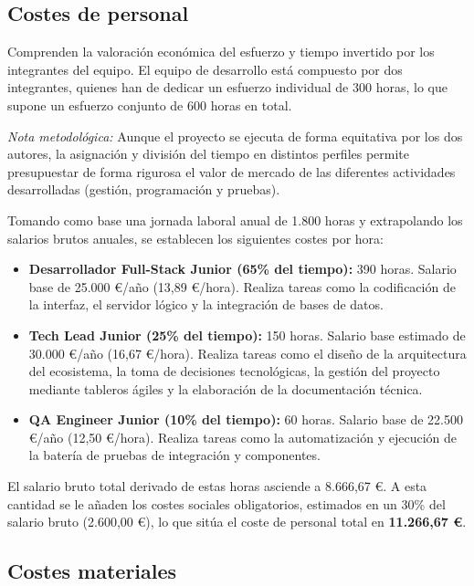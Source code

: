 \subsection{Costes de personal}

Comprenden la valoración económica del esfuerzo y tiempo invertido por los integrantes del equipo. El equipo de desarrollo está compuesto por dos integrantes, quienes han de dedicar un esfuerzo individual de 300 horas, lo que supone un esfuerzo conjunto de 600 horas en total. 

\textit{Nota metodológica:} Aunque el proyecto se ejecuta de forma equitativa por los dos autores, la asignación y división del tiempo en distintos perfiles permite presupuestar de forma rigurosa el valor de mercado de las diferentes actividades desarrolladas (gestión, programación y pruebas).

Tomando como base una jornada laboral anual de 1.800 horas y extrapolando los salarios brutos anuales, se establecen los siguientes costes por hora:
\begin{itemize}
    \item \textbf{Desarrollador Full-Stack Junior (65\% del tiempo):} 390 horas. Salario base de 25.000 \euro/año (13,89 \euro/hora). Realiza tareas como la codificación de la interfaz, el servidor lógico y la integración de bases de datos.
    \item \textbf{Tech Lead Junior (25\% del tiempo):} 150 horas. Salario base estimado de 30.000 \euro/año (16,67 \euro/hora). Realiza tareas como el diseño de la arquitectura del ecosistema, la toma de decisiones tecnológicas, la gestión del proyecto mediante tableros ágiles y la elaboración de la documentación técnica.
    \item \textbf{QA Engineer Junior (10\% del tiempo):} 60 horas. Salario base de 22.500 \euro/año (12,50 \euro/hora). Realiza tareas como la automatización y ejecución de la batería de pruebas de integración y componentes.
\end{itemize}

El salario bruto total derivado de estas horas asciende a 8.666,67 \euro. A esta cantidad se le añaden los costes sociales obligatorios, estimados en un 30\% del salario bruto (2.600,00 \euro), lo que sitúa el coste de personal total en \textbf{11.266,67 \euro}.

\subsection{Costes materiales}

